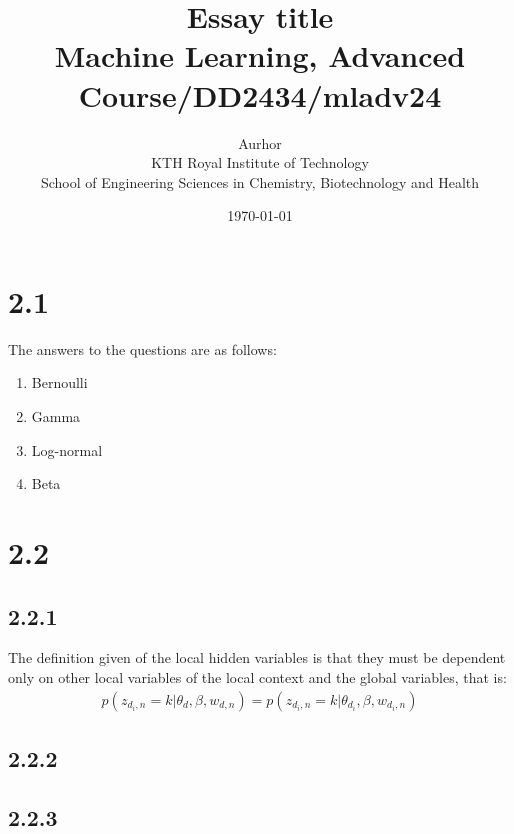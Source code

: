 \documentclass{article}
\title{Essay title\\\Large{Machine Learning, Advanced Course/DD2434/mladv24}}
\author{Aurhor \\ KTH Royal Institute of Technology\\ School of Engineering Sciences in Chemistry, Biotechnology and Health}
\date{\today}
\begin{document}
\maketitle

\fancyfoot[C]{\thepage}
\begin{multicols}{2}

    \section*{2.1}
    The answers to the questions are as follows:
    \begin{enumerate}[noitemsep, topsep=0pt]
        \item Bernoulli
        \item Gamma
        \item Log-normal
        \item Beta
    \end{enumerate}
    \section*{2.2}
    \subsection*{2.2.1} 
    The definition given of the local hidden variables is that they must be dependent
    only on other local variables of the local context and the global variables, that is:
    \begin{align}
        p(z_{d_i,n} = k |\theta_d, \beta, w_{d,n}) = p(z_{d_i,n} = k | \theta_{d_i}, \beta, w_{d_i,n})
    \end{align}
    \subsection*{2.2.2}

    \subsection*{2.2.3}
    
\end{multicols}

\clearpage
{}
\end{document}
